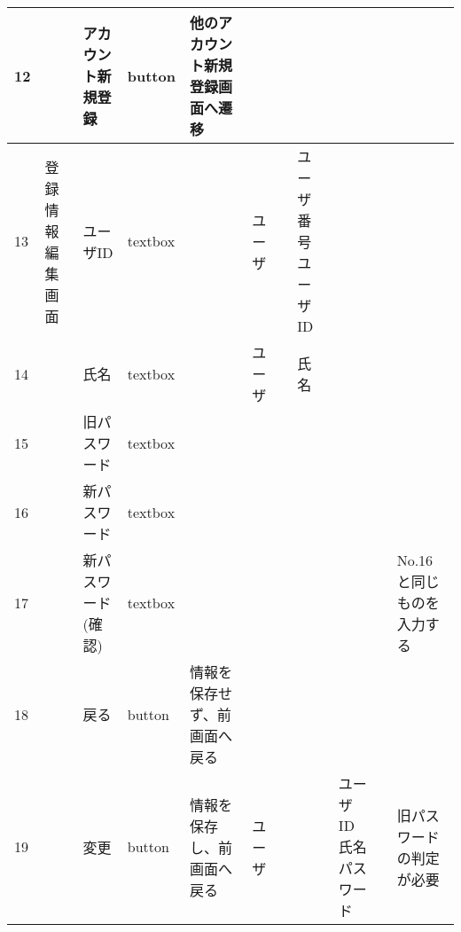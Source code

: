 \begin{landscape}
\begin{table}[]
\begin{tabular}{|l|l|l|l|l|l|l|l|l|l|l|}
12  &               & アカウント新規登録        & button   & 他のアカウント新規登録画面へ遷移                                                  &         &                       &                    &                 &                               &                                                                \\ \hline
13  & 登録情報編集画面      & ユーザID            & textbox  &                                                                   & ユーザ     &                       & ユーザ番号ユーザID         &                 &                               &                                                                \\ \hline
14  &               & 氏名               & textbox  &                                                                   & ユーザ     &                       & 氏名                 &                 &                               &                                                                \\ \hline
15  &               & 旧パスワード           & textbox  &                                                                   &         &                       &                    &                 &                               &                                                                \\ \hline
16  &               & 新パスワード           & textbox  &                                                                   &         &                       &                    &                 &                               &                                                                \\ \hline
17  &               & 新パスワード(確認)       & textbox  &                                                                   &         &                       &                    &                 &                               & No.16と同じものを入力する                                                \\ \hline
18  &               & 戻る               & button   & 情報を保存せず、前画面へ戻る                                                    &         &                       &                    &                 &                               &                                                                \\ \hline
19  &               & 変更               & button   & 情報を保存し、前画面へ戻る                                                     & ユーザ     &                       &                    & ユーザID氏名パスワード    &                               & 旧パスワードの判定が必要                                                   \\ \hline

\end{tabular}
\end{table}
\end{landscape}
